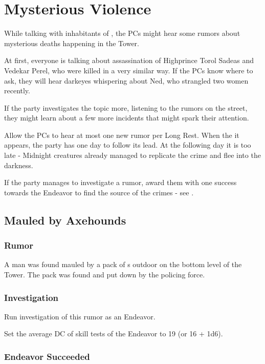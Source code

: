 \section{Mysterious Violence}
\label{sec:mysteriousViolence}

While talking with inhabitants of \locationUrithiru{}, the PCs might hear some rumors about mysterious deaths happening in the Tower. 

At first, everyone is talking about assassination of Highprince Torol Sadeas and Vedekar Perel, who were killed in a very similar way. If the PCs know where to ask, they will hear darkeyes whispering about Ned, who strangled two women recently.

If the party investigates the topic more, listening to the rumors on the street, they might learn about a few more incidents that might spark their attention.

Allow the PCs to hear at most one new rumor per Long Rest. When the it appears, the party has one day to follow its lead. At the following day it is too late - Midnight creatures already managed to replicate the crime and flee into the darkness.

If the party manages to investigate a rumor, award them with one success towards the Endeavor to find the source of the crimes - see .



\subsection{Mauled by Axehounds}

\subsubsection{Rumor}

A man was found mauled by a pack of \enemyAxehound{}s outdoor on the bottom level of the Tower. The pack was found and put down by the policing force.

\subsubsection{Investigation}

Run investigation of this rumor as an Endeavor. 

Set the average DC of skill tests of the Endeavor to 19 (or 16 + 1d6).

\subsubsection{Endeavor Succeeded}

